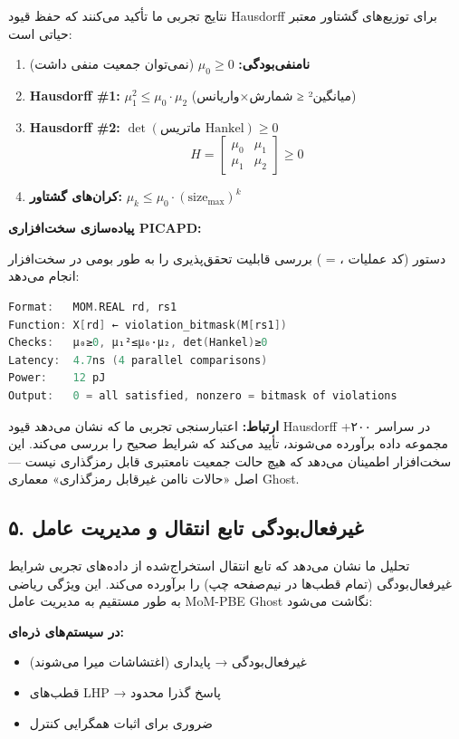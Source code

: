 \documentclass[12pt, a4paper]{article}
\begin{document}
نتایج تجربی ما تأکید می‌کنند که حفظ قیود Hausdorff برای توزیع‌های گشتاور معتبر حیاتی است:

\begin{enumerate}
\item \textbf{نامنفی‌بودگی:} $\mu_0 \geq 0$ (نمی‌توان جمعیت منفی داشت)
\item \textbf{Hausdorff \#1:} $\mu_1^2 \leq \mu_0 \cdot \mu_2$ (میانگین² ≤ شمارش×واریانس)
\item \textbf{Hausdorff \#2:} $\det(\text{ماتریس Hankel}) \geq 0$
\begin{equation}
H = \begin{bmatrix} \mu_0 & \mu_1 \\ \mu_1 & \mu_2 \end{bmatrix} \geq 0
\end{equation}
\item \textbf{کران‌های گشتاور:} $\mu_k \leq \mu_0 \cdot (\text{size}_{\max})^k$
\end{enumerate}

\textbf{پیاده‌سازی سخت‌افزاری PICAPD:}

دستور \textbf{} (کد عملیات ،  = ) بررسی قابلیت تحقق‌پذیری را به طور بومی در سخت‌افزار انجام می‌دهد:

\begin{lstlisting}[language=C]
Format:   MOM.REAL rd, rs1
Function: X[rd] ← violation_bitmask(M[rs1])
Checks:   μ₀≥0, μ₁²≤μ₀·μ₂, det(Hankel)≥0
Latency:  4.7ns (4 parallel comparisons)
Power:    12 pJ
Output:   0 = all satisfied, nonzero = bitmask of violations
\end{lstlisting}

\textbf{ارتباط:} اعتبارسنجی تجربی ما که نشان می‌دهد قیود Hausdorff در سراسر ۲۰۰+ مجموعه داده برآورده می‌شوند، تأیید می‌کند که  شرایط صحیح را بررسی می‌کند. این سخت‌افزار اطمینان می‌دهد که هیچ حالت جمعیت نامعتبری قابل رمزگذاری نیست — اصل «حالات ناامن غیرقابل رمزگذاری» معماری Ghost.

\subsection*{۵. غیرفعال‌بودگی تابع انتقال و مدیریت عامل}

تحلیل ما نشان می‌دهد که تابع انتقال استخراج‌شده از داده‌های تجربی شرایط غیرفعال‌بودگی (تمام قطب‌ها در نیم‌صفحه چپ) را برآورده می‌کند. این ویژگی ریاضی به طور مستقیم به مدیریت عامل MoM-PBE Ghost نگاشت می‌شود:

\textbf{در سیستم‌های ذره‌ای:}
\begin{itemize}
\item غیرفعال‌بودگی → پایداری (اغتشاشات میرا می‌شوند)
\item قطب‌های LHP → پاسخ گذرا محدود
\item ضروری برای اثبات همگرایی کنترل
\end{itemize}
\end{document}
